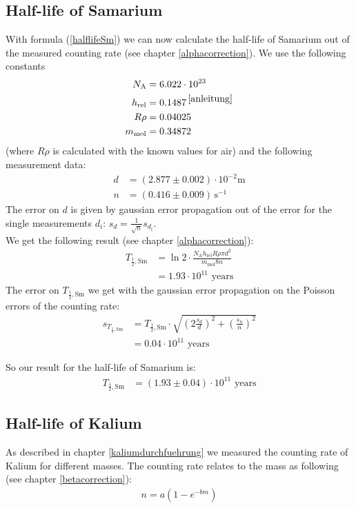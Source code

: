 \documentclass[12pt]{article}
\begin{document}
\subsection{Half-life of Samarium}
With formula (\ref{halflifeSm}) we can now calculate the half-life of Samarium out of the measured counting rate (see chapter \ref{alphacorrection}). We use the following constants
\begin{align*}
	N_{\text{A}}&=6.022\cdot10^{23}\\
	h_{\text{rel}}&=0.1487\,^{\cite{anleitung}}\\
	R\rho&=0.04025\\
	m_{\text{mol}}&=0.34872
\end{align*}
(where $R\rho$ is calculated with the known values for air)
and the following measurement data:
\begin{align*}
	d&=(2.877\pm0.002)\cdot10^{-2}\mathrm{m}\\
	n&=(0.416\pm0.009)\,\mathrm{s^{-1}}
\end{align*}
The error on $d$ is given by gaussian error propagation out of the error for the single measurements $d_i$: $s_d=\frac1{\sqrt{n}}s_{d_i}$.\\
We get the following result (see chapter \ref{alphacorrection}): 
\begin{align*}
	T_{\frac12,\text{Sm}}&=\ln2\cdot\frac{N_{\text{A}}h_{\text{rel}}R\rho\pi d^2}{m_{\text{mol}}8n}\\&=1.93\cdot 10^{11}\text{ years}
\end{align*}
The error on $T_{\frac12,\text{Sm}}$ we get with the gaussian error propagation on the Poisson errors of the counting rate: 
\begin{align*}
	s_{T_{\frac12,\text{Sm}}}&=T_{\frac12,\text{Sm}}\cdot\sqrt{\left(2\frac{s_d}{d}\right)^2+\left(\frac{s_n}{n}\right)^2}\\&=0.04\cdot 10^{11}\text{ years}
\end{align*}

So our result for the half-life of Samarium is:
\begin{align*}
	T_{\frac12,\text{Sm}}&=\left(1.93\pm0.04\right)\cdot10^{11}\text{ years}
\end{align*}
\newpage
\subsection{Half-life of Kalium}
As described in chapter \ref{kaliumdurchfuehrung} we measured the counting rate of Kalium for different masses. The counting rate relates to the mass as following (see chapter \ref{betacorrection}): 
\begin{align}
	n=a(1-e^{-bm})\label{fitfunction}
\end{align}
\end{document}
